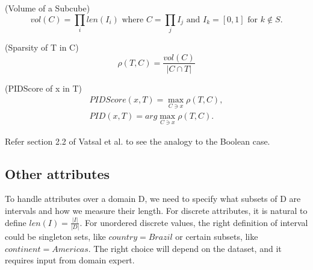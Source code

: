 \begin{defn}
    \label{defn:volume-of-subcube}
    (Volume of a Subcube)
    \vspace{-1em}
    \begin{equation}
        \label{eq:volume-of-subcube}
        vol(C) = \prod_i len(I_i) \textrm{ where } C = \prod_j I_j \textrm{ and } I_k = [0,1] \textrm{ for } k \notin S.
    \end{equation}
\end{defn}

\begin{defn}
    \label{defn:sparsity}
    (Sparsity of T in C)
    \vspace{-1em}
    \begin{equation}
        \label{eq:sparsity}
        \rho (T,C) = \frac{vol(C)}{\vert C \cap T \vert}
    \end{equation}
\end{defn}

\pagebreak

\begin{defn}
    \label{defn:pidscore}
    (PIDScore of x in T)
    \vspace{-1em}
    \begin{equation}
        \label{eq:pidscore}
        \begin{split}
            PIDScore(x,T) = \max_{C \ni x} \rho (T,C), \\
            PID(x,T) = arg \max_{C \ni x} \rho (T,C).
        \end{split}
    \end{equation}
\end{defn}

Refer section 2.2 of Vatsal et al. \cite{NIPS2019_9710} to see the analogy to the Boolean case.

\subsection{Other attributes}
\label{subsec:other-attributes}

To handle attributes over a domain D, we need to specify what subsets of D are intervals and how we measure their length.
For discrete attributes, it is natural to define $len(I) = \frac{\vert I \vert}{\vert D \vert}$.
For unordered discrete values, the right definition of interval could be singleton sets, like $country = Brazil$ or certain subsets, like $continent = Americas$.
The right choice will depend on the dataset, and it requires input from domain expert.

